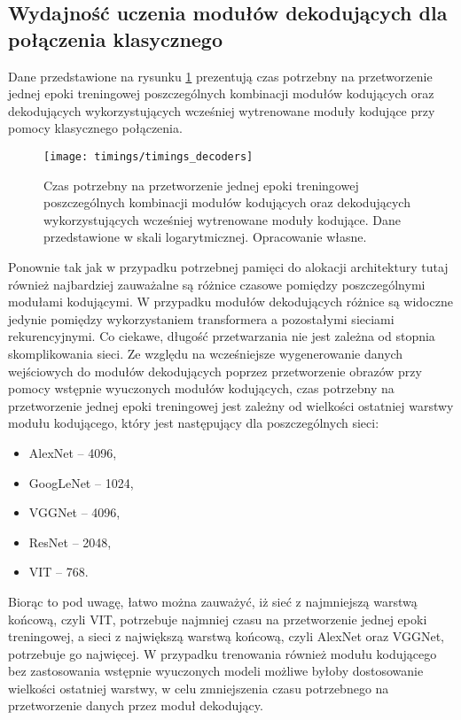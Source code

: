 \subsection{Wydajność uczenia modułów dekodujących dla połączenia klasycznego}
Dane przedstawione na rysunku \ref{fig:timings-decoders} prezentują czas potrzebny na przetworzenie jednej epoki treningowej poszczególnych kombinacji modułów kodujących oraz dekodujących wykorzystujących wcześniej wytrenowane moduły kodujące przy pomocy klasycznego połączenia.
\begin{figure}[H]
    \centering
    \texttt{[image: timings/timings\_decoders]}
    \caption{Czas potrzebny na przetworzenie jednej epoki treningowej poszczególnych kombinacji modułów kodujących oraz dekodujących wykorzystujących wcześniej wytrenowane moduły kodujące. Dane przedstawione w skali logarytmicznej. Opracowanie własne.}
    \label{fig:timings-decoders}
\end{figure}
\noindent Ponownie tak jak w przypadku potrzebnej pamięci do alokacji architektury tutaj również najbardziej zauważalne są różnice czasowe pomiędzy poszczególnymi modułami kodującymi. W przypadku modułów dekodujących różnice są widoczne jedynie pomiędzy wykorzystaniem transformera a pozostałymi sieciami rekurencyjnymi. Co ciekawe, długość przetwarzania nie jest zależna od stopnia skomplikowania sieci. Ze względu na wcześniejsze wygenerowanie danych wejściowych do modułów dekodujących poprzez przetworzenie obrazów przy pomocy wstępnie wyuczonych modułów kodujących, czas potrzebny na przetworzenie jednej epoki treningowej jest zależny od wielkości ostatniej warstwy modułu kodującego, który jest następujący dla poszczególnych sieci:
\begin{itemize}
    \item AlexNet -- 4096,
    \item GoogLeNet -- 1024,
    \item VGGNet -- 4096,
    \item ResNet -- 2048,
    \item VIT -- 768.
\end{itemize}
Biorąc to pod uwagę, łatwo można zauważyć, iż sieć z najmniejszą warstwą końcową, czyli VIT, potrzebuje najmniej czasu na przetworzenie jednej epoki treningowej, a sieci z największą warstwą końcową, czyli AlexNet oraz VGGNet, potrzebuje go najwięcej. W przypadku trenowania również modułu kodującego bez zastosowania wstępnie wyuczonych modeli możliwe byłoby dostosowanie wielkości ostatniej warstwy, w celu zmniejszenia czasu potrzebnego na przetworzenie danych przez moduł dekodujący.

